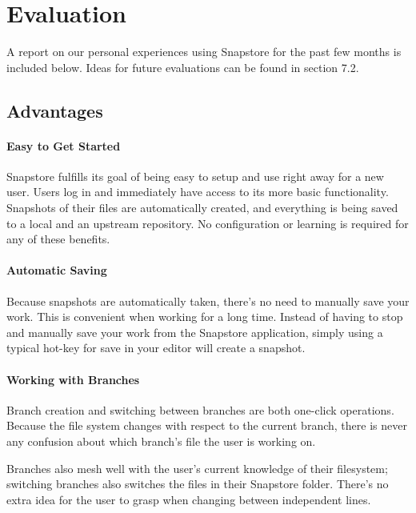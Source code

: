 \chapter{Evaluation}

A report on our personal experiences using Snapstore for the past few months is included below. Ideas for future evaluations can be found in section 7.2.

\section{Advantages}

\subsubsection{Easy to Get Started}

Snapstore fulfills its goal of being easy to setup and use right away for a new user. Users log in and immediately have access to its more basic functionality. Snapshots of their files are automatically created, and everything is being saved to a local and an upstream repository. No configuration or learning is required for any of these benefits. 

\subsubsection{Automatic Saving}

Because snapshots are automatically taken, there's no need to manually save your work. This is convenient when working for a long time. Instead of having to stop and manually save your work from the Snapstore application, simply using a typical hot-key for save in your editor will create a snapshot.

\subsubsection{Working with Branches}

Branch creation and switching between branches are both one-click operations. Because the file system changes with respect to the current branch, there is never any confusion about which branch's file the user is working on.

Branches also mesh well with the user's current knowledge of their filesystem; switching branches also switches the files in their Snapstore folder. There's no extra idea for the user to grasp when changing between independent lines. 


